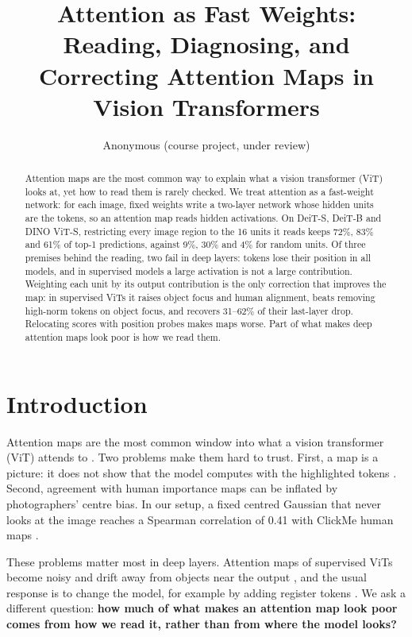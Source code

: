 \documentclass{article}
\title{Attention as Fast Weights: Reading, Diagnosing, and Correcting Attention Maps in Vision Transformers}
\author{Anonymous (course project, under review)}
\begin{document}
\maketitle

\begin{abstract}
Attention maps are the most common way to explain what a vision transformer (ViT) looks at, yet how to read them is rarely checked. We treat attention as a fast-weight network: for each image, fixed weights write a two-layer network whose hidden units are the tokens, so an attention map reads hidden activations. On DeiT-S, DeiT-B and DINO ViT-S, restricting every image region to the 16 units it reads keeps 72\%, 83\% and 61\% of top-1 predictions, against 9\%, 30\% and 4\% for random units. Of three premises behind the reading, two fail in deep layers: tokens lose their position in all models, and in supervised models a large activation is not a large contribution. Weighting each unit by its output contribution is the only correction that improves the map: in supervised ViTs it raises object focus and human alignment, beats removing high-norm tokens on object focus, and recovers 31--62\% of their last-layer drop. Relocating scores with position probes makes maps worse. Part of what makes deep attention maps look poor is how we read them.
\end{abstract}

\section{Introduction}

Attention maps are the most common window into what a vision transformer (ViT) \citep{dosovitskiy2021} attends to \citep{abnar2020,caron2021}. Two problems make them hard to trust. First, a map is a picture: it does not show that the model computes with the highlighted tokens \citep{jain2019,wiegreffe2019}. Second, agreement with human importance maps can be inflated by photographers' centre bias. In our setup, a fixed centred Gaussian that never looks at the image reaches a Spearman correlation of 0.41 with ClickMe human maps \citep{linsley2019}.

These problems matter most in deep layers. Attention maps of supervised ViTs become noisy and drift away from objects near the output \citep{darcet2024}, and the usual response is to change the model, for example by adding register tokens \citep{darcet2024,jiang2025}. We ask a different question: \textbf{how much of what makes an attention map look poor comes from how we read it, rather than from where the model looks?}
\end{document}
